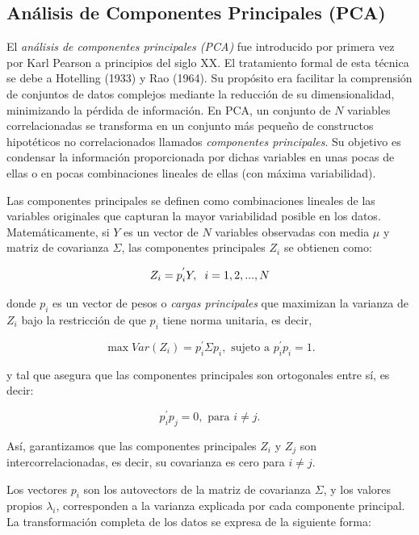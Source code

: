 \subsection{Análisis de Componentes Principales (PCA)}

El \textit{análisis de componentes principales (PCA)} fue introducido por primera vez por Karl Pearson a principios del siglo XX. El 
tratamiento formal de esta técnica se debe a Hotelling (1933) y Rao (1964). Su propósito era facilitar la comprensión de conjuntos 
de datos complejos mediante la reducción de su dimensionalidad, minimizando la pérdida de información. En PCA, un conjunto de $N$ variables correlacionadas
se transforma en un conjunto más pequeño de constructos hipotéticos no correlacionados llamados \textit{componentes principales}.
Su objetivo es condensar la información proporcionada por dichas variables en unas pocas de ellas o en pocas combinaciones lineales de 
ellas (con máxima variabilidad). \newline %


Las componentes principales se definen como combinaciones lineales de las variables originales que capturan la mayor variabilidad
posible en los datos. Matemáticamente, si $Y$ es un vector de $N$ variables observadas con media $\mu$ y matriz de covarianza $\Sigma$,
las componentes principales $Z_{i}$ se obtienen como:


\[
Z_{i} = p^{'}_{i} Y, \hspace{0.2cm} i=1,2,...,N
\]

donde $p_{i}$ es un vector de pesos o \textit{cargas principales} que maximizan la varianza de $Z_{i}$ bajo la restricción de que $p_{i}$
tiene norma unitaria, es decir,

\[%
\max Var(Z_{i}) = p_{i}^{'}\Sigma p_{i}, \text{ sujeto a } p_{i}^{'}p_{i} = 1.
\]

y tal que asegura que las componentes principales son ortogonales entre sí, es decir:

\[
p_{i}^{'}p_{j} = 0, \text{ para } i \neq j.
\]

Así, garantizamos que las componentes principales $Z_{i}$ y $Z_{j}$ son intercorrelacionadas, es decir, su covarianza es cero para $i\neq j$.


Los vectores $p_{i}$ son los autovectors de la matriz de covarianza $\Sigma$, y los valores propios $\lambda_{i}$, corresponden
a la varianza explicada por cada componente principal. La transformación completa de los datos se expresa de la siguiente forma:

